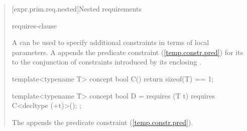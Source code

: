 \begin{quote}
[expr.prim.req.nested]{Nested requirements}

\begin{bnf}
\br
    requires-clause \terminal{;}
  \end{bnf}

\pnum
A  can be used
to specify additional constraints in terms of local parameters.
%
A  appends the predicate constraint 
(\ref{temp.constr.pred}) for its  
to the conjunction of constraints introduced by its enclosing
.

\enterexample
\begin{codeblock}
template<typename T> concept bool C() { return sizeof(T) == 1; }

template<typename T> concept bool D =
  requires (T t) {
    requires C<decltype (+t)>();
  };
\end{codeblock}
The  appends the predicate constraint 
 (\ref{temp.constr.pred}).
\exitexample

\end{quote}